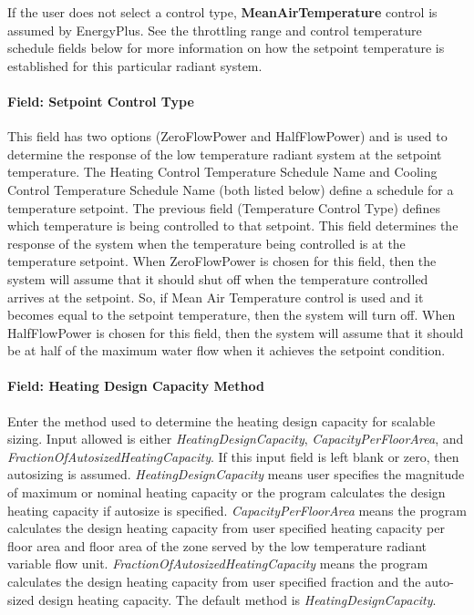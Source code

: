 If the user does not select a control type, \textbf{MeanAirTemperature} control is assumed by EnergyPlus. See the throttling range and control temperature schedule fields below for more information on how the setpoint temperature is established for this particular radiant system.

\paragraph{Field: Setpoint Control Type}\label{field-variable-flow-radiant-system-setpoint-control-type}

This field has two options (ZeroFlowPower and HalfFlowPower) and is used to determine the response of the low temperature radiant system at the setpoint temperature.  The Heating Control Temperature Schedule Name and Cooling Control Temperature Schedule Name (both listed below) define a schedule for a temperature setpoint.  The previous field (Temperature Control Type) defines which temperature is being controlled to that setpoint.  This field determines the response of the system when the temperature being controlled is at the temperature setpoint.  When ZeroFlowPower is chosen for this field, then the system will assume that it should shut off when the temperature controlled arrives at the setpoint.  So, if Mean Air Temperature control is used and it becomes equal to the setpoint temperature, then the system will turn off.  When HalfFlowPower is chosen for this field, then the system will assume that it should be at half of the maximum water flow when it achieves the setpoint condition.

\paragraph{Field: Heating Design Capacity Method}\label{field-heating-design-capacity-method-5}

Enter the method used to determine the heating design capacity for scalable sizing. Input allowed is either \emph{HeatingDesignCapacity}, \emph{CapacityPerFloorArea}, and \emph{FractionOfAutosizedHeatingCapacity}. If this input field is left blank or zero, then autosizing is assumed. \emph{HeatingDesignCapacity} means user specifies the magnitude of maximum or nominal heating capacity or the program calculates the design heating capacity if autosize is specified. \emph{CapacityPerFloorArea} means the program calculates the design heating capacity from user specified heating capacity per floor area and floor area of the zone served by the low temperature radiant variable flow unit. \emph{FractionOfAutosizedHeatingCapacity} means the program calculates the design heating capacity from user specified fraction and the auto-sized design heating capacity. The default method is \emph{HeatingDesignCapacity}.

